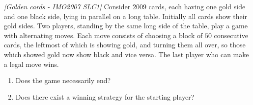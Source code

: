 \begin{problem}
\textit{[Golden cards - IMO2007 SLC1]}
Consider $2009$ cards, each having one gold side and one black side, lying in parallel on a long table. Initially all cards show their gold sides. Two players, standing by the same long side of the table, play a game with alternating moves. Each move consists of choosing a block of $50$ consecutive cards, the leftmost of which is showing gold, and turning them all over, so those which showed gold now show black and vice versa. The last player who can make a legal move wins.
\begin{enumerate}
\item Does the game necessarily end?
\item Does there exist a winning strategy for the starting player?
\end{enumerate}
\end{problem}
%


